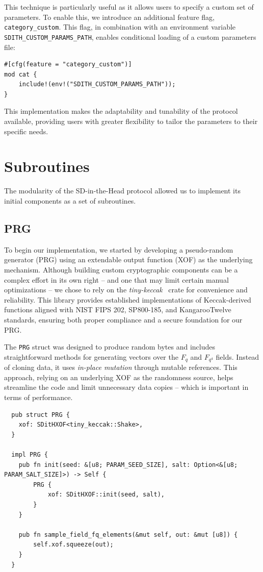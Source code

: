 \documentclass[11pt]{report}
\theoremstyle{definition}
\theoremstyle{plain}
\begin{document}
This technique is particularly useful as it allows users to specify a custom set of parameters. To enable this, we introduce an additional feature flag, \texttt{category\_custom}. This flag, in combination with an environment variable \texttt{SDITH\_CUSTOM\_PARAMS\_PATH}, enables conditional loading of a custom parameters file:

\begin{verbatim}
#[cfg(feature = "category_custom")]
mod cat {
    include!(env!("SDITH_CUSTOM_PARAMS_PATH"));
}
\end{verbatim}

This implementation makes the adaptability and tunability of the protocol available, providing users with greater flexibility to tailor the parameters to their specific needs.

\section{Subroutines}\label{sub:subroutines}
The modularity of the SD-in-the-Head protocol allowed us to implement its initial components as a set of subroutines.

\subsection{PRG}\label{sub:prg}
To begin our implementation, we started by developing a pseudo-random generator (PRG) using an extendable output function (XOF) as the underlying mechanism. Although building custom cryptographic components can be a complex effort in its own right -- and one that may limit certain manual optimizations -- we chose to rely on the \textit{tiny-keccak}~\cite{tinykeccak} crate for convenience and reliability. This library provides established implementations of Keccak-derived functions aligned with NIST FIPS 202, SP800-185, and KangarooTwelve standards, ensuring both proper compliance and a secure foundation for our PRG.

The \texttt{PRG} struct was designed to produce random bytes and includes straightforward methods for generating vectors over the $F_q$ and $F_{q^4}$ fields. Instead of cloning data, it uses \emph{in-place mutation} through mutable references. This approach, relying on an underlying XOF as the randomness source, helps streamline the code and limit unnecessary data copies -- which is important in terms of performance.

\begin{verbatim}
  pub struct PRG {
    xof: SDitHXOF<tiny_keccak::Shake>,
  }

  impl PRG {
    pub fn init(seed: &[u8; PARAM_SEED_SIZE], salt: Option<&[u8; PARAM_SALT_SIZE]>) -> Self {
        PRG {
            xof: SDitHXOF::init(seed, salt),
        }
    }

    pub fn sample_field_fq_elements(&mut self, out: &mut [u8]) {
        self.xof.squeeze(out);
    }
  }
\end{verbatim}
\end{document}
